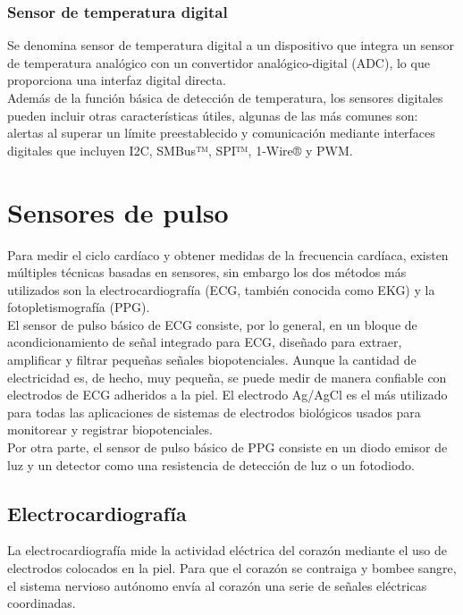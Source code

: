 		\subsubsection{Sensor de temperatura digital}
		Se denomina sensor de temperatura digital a un dispositivo que integra un sensor de temperatura analógico con un convertidor analógico-digital (ADC), lo que proporciona una interfaz digital directa. \cite{maximThermal} \\
				
	    Además de la función básica de detección de temperatura, los sensores digitales pueden incluir otras características útiles, algunas de las más comunes son: alertas al superar un límite preestablecido y comunicación mediante interfaces digitales que incluyen I2C, SMBus™, SPI™, 1-Wire® y PWM.
	
	\section{Sensores de pulso}
	
	Para medir el ciclo cardíaco y obtener medidas de la frecuencia cardíaca, existen múltiples técnicas basadas en sensores, sin embargo los dos métodos más utilizados son la electrocardiografía (ECG, también conocida como EKG) y la fotopletismografía (PPG). \cite{soenh2017} \\
	
	El sensor de pulso básico de ECG consiste, por lo general, en un bloque de acondicionamiento de señal integrado para ECG, diseñado para extraer, amplificar y filtrar pequeñas señales biopotenciales. Aunque la cantidad de electricidad es, de hecho, muy pequeña, se puede medir de manera confiable con electrodos de ECG adheridos a la piel. El electrodo Ag/AgCl es el más utilizado para todas las aplicaciones de sistemas de electrodos biológicos usados para monitorear y registrar biopotenciales. \cite{naylampECG} \cite{imotionsECG} \cite{salvatore2011} \\
	
	Por otra parte, el sensor de pulso básico de PPG consiste en un diodo emisor de luz y un detector como una resistencia de detección de luz o un fotodiodo. \cite{agarwalHS}

	\subsection{Electrocardiografía}
		La electrocardiografía mide la actividad eléctrica del corazón mediante el uso de electrodos colocados en la piel. Para que el corazón se contraiga y bombee sangre, el sistema nervioso autónomo envía al corazón una serie de señales eléctricas coordinadas. \\
		
